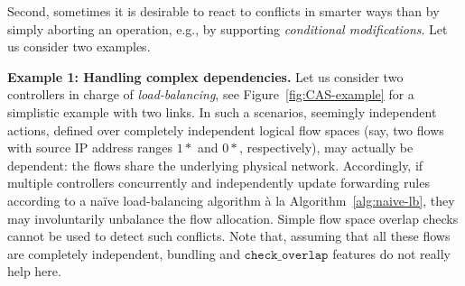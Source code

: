 \documentclass[conference]{sigcomm-alternate}
\newcommand{\checko}{\texttt{check\_overlap}\xspace}
\newcommand{\liron}[1]{\textit{\textcolor{mygreen}{[liron]: #1}}} %
\begin{document}

Second, sometimes it is desirable to react to conflicts in smarter ways than
by simply aborting an operation, e.g., by supporting \emph{conditional modifications}.
Let us consider two examples.

\vspace{1mm}
\noindent \textbf{Example 1: Handling complex dependencies.} Let us consider two controllers
in charge
of \emph{load-balancing}, see Figure~\ref{fig:CAS-example} 
for a simplistic example with two links. 
In such a scenarios, seemingly independent actions, defined over
completely independent logical flow spaces (say, two flows with source IP address ranges $1*$ and $0*$,
respectively),
may actually be dependent: the flows share the underlying physical network.
Accordingly, if multiple controllers concurrently and independently
update forwarding rules according to a na\"ive load-balancing algorithm \`{a} la Algorithm~\ref{alg:naive-lb},
they may involuntarily
unbalance the flow allocation.
Simple flow space overlap checks cannot be used to detect
such conflicts.
Note that, assuming that all these flows are
completely independent, bundling and $\checko$ features do not really
help here.

\end{document}
